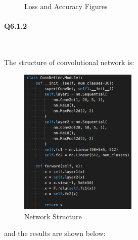 \documentclass[11pt]{article} \usepackage{fullpage} \usepackage{graphicx} \usepackage{epstopdf} \usepackage{color} \usepackage{psfrag} \usepackage{pdfsync}\usepackage{indentfirst}\usepackage{subfigure}\usepackage{float}\usepackage[section]{placeins}
\begin{document}
\begin{figure}[H]
\centering
{}
\caption{Loss and Accuracy Figures}
\end{figure}


\paragraph{Q6.1.2}~{}

The structure of convolutional network is:
\begin{figure}[H]
\centering
\includegraphics[width=0.5\textwidth]{results/q6_1_2.png}
\caption{Network Structure}
\end{figure}
and the results are shown below:
\end{document}
